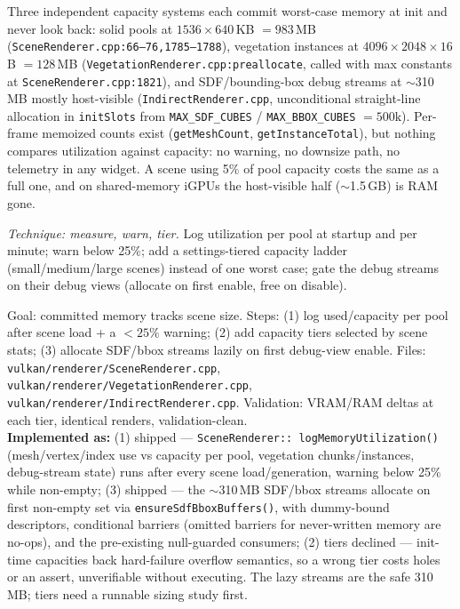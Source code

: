 \documentclass[11pt,a4paper]{article}
\begin{document}
Three independent capacity systems each commit worst-case memory at init and
never look back: solid pools at $1536 \times 640$\,KB $= 983$\,MB
(\texttt{SceneRenderer.cpp:66--76,1785--1788}), vegetation instances at
$4096 \times 2048 \times 16$\,B $= 128$\,MB
(\texttt{VegetationRenderer.cpp:preallocate}, called with max constants at
\texttt{SceneRenderer.cpp:1821}), and SDF/bounding-box debug streams at
$\sim$310\,MB mostly host-visible (\texttt{IndirectRenderer.cpp}, unconditional
straight-line allocation in \texttt{initSlots} from \texttt{MAX\_SDF\_CUBES} /
\texttt{MAX\_BBOX\_CUBES} $= 500\mathrm{k}$). Per-frame memoized counts exist
(\texttt{getMeshCount}, \texttt{getInstanceTotal}), but nothing compares
utilization against capacity: no warning, no downsize path, no telemetry in
any widget. A scene using 5\% of pool capacity costs the same as a full one,
and on shared-memory iGPUs the host-visible half ($\sim$1.5\,GB) is RAM gone.

\textit{Technique: measure, warn, tier.} Log utilization per pool at startup
and per minute; warn below 25\%; add a settings-tiered capacity ladder
(small/medium/large scenes) instead of one worst case; gate the debug
streams on their debug views (allocate on first enable, free on disable).

\begin{tcolorbox}[promptbox={Prompt --- C1: utilization feedback and tiered pools}]
Goal: committed memory tracks scene size. Steps: (1) log
used/capacity per pool after scene load + a $<25\%$ warning; (2) add
capacity tiers selected by scene stats; (3) allocate SDF/bbox streams
lazily on first debug-view enable. Files:
\texttt{vulkan/renderer/SceneRenderer.cpp},
\texttt{vulkan/renderer/VegetationRenderer.cpp},
\texttt{vulkan/renderer/IndirectRenderer.cpp}. Validation: VRAM/RAM deltas
at each tier, identical renders, validation-clean.
\\ \textbf{Implemented as:} (1) shipped --- \texttt{SceneRenderer::
logMemoryUtilization()} (mesh/vertex/index use vs capacity per pool,
vegetation chunks/instances, debug-stream state) runs after every scene
load/generation, warning below 25\% while non-empty; (3) shipped --- the
$\sim$310\,MB SDF/bbox streams allocate on first non-empty set via
\texttt{ensureSdfBboxBuffers()}, with dummy-bound descriptors,
conditional barriers (omitted barriers for never-written memory are
no-ops), and the pre-existing null-guarded consumers; (2) tiers declined
--- init-time capacities back hard-failure overflow semantics, so a wrong
tier costs holes or an assert, unverifiable without executing. The lazy
streams are the safe 310\,MB; tiers need a runnable sizing study first.
\end{tcolorbox}
\end{document}
